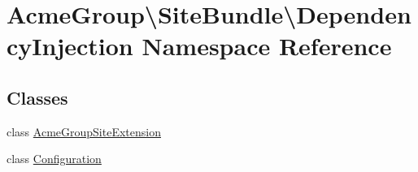 \hypertarget{namespace_acme_group_1_1_site_bundle_1_1_dependency_injection}{\section{Acme\+Group\textbackslash{}Site\+Bundle\textbackslash{}Dependency\+Injection Namespace Reference}
\label{namespace_acme_group_1_1_site_bundle_1_1_dependency_injection}
}
\subsection*{Classes}
\begin{DoxyCompactItemize}
\item 
class \hyperlink{class_acme_group_1_1_site_bundle_1_1_dependency_injection_1_1_acme_group_site_extension}{Acme\+Group\+Site\+Extension}
\item 
class \hyperlink{class_acme_group_1_1_site_bundle_1_1_dependency_injection_1_1_configuration}{Configuration}
\end{DoxyCompactItemize}
